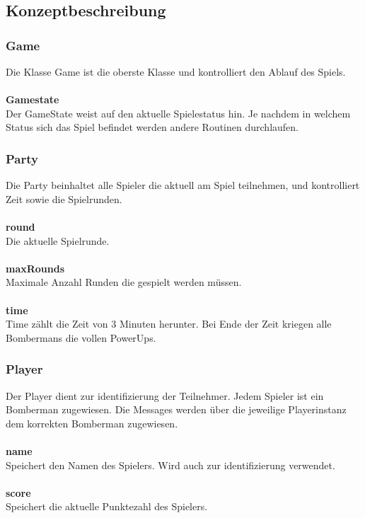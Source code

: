 \documentclass[11pt]{scrartcl}
\begin{document}
\subsection{Konzeptbeschreibung}
\label{sec:Konzeptbeschreibung}

\subsubsection{Game}
\label{sec:Game}
Die Klasse Game ist die oberste Klasse und kontrolliert den Ablauf des Spiels. \\\\
\textbf{Gamestate} \\
Der GameState weist auf den aktuelle Spielestatus hin. Je nachdem in welchem Status sich das Spiel befindet werden andere Routinen durchlaufen.

\subsubsection{Party}
\label{sec:party}
Die Party beinhaltet alle Spieler die aktuell am Spiel teilnehmen, und kontrolliert Zeit sowie die Spielrunden.
\\\\
\textbf{round}\\
Die aktuelle Spielrunde.
\\\\
\textbf{maxRounds}\\
Maximale Anzahl Runden die gespielt werden müssen.
\\\\
\textbf{time}\\
Time zählt die Zeit von 3 Minuten herunter. Bei Ende der Zeit kriegen alle Bombermans die vollen PowerUps.

\subsubsection{Player}
\label{sec:Player}
Der Player dient zur identifizierung der Teilnehmer. Jedem Spieler ist ein Bomberman zugewiesen. Die Messages werden über die jeweilige Playerinstanz dem korrekten Bomberman zugewiesen.
\\\\
\textbf{name}\\
Speichert den Namen des Spielers. Wird auch zur identifizierung verwendet.
\\\\
\textbf{score}\\
Speichert die aktuelle Punktezahl des Spielers.
\end{document}
